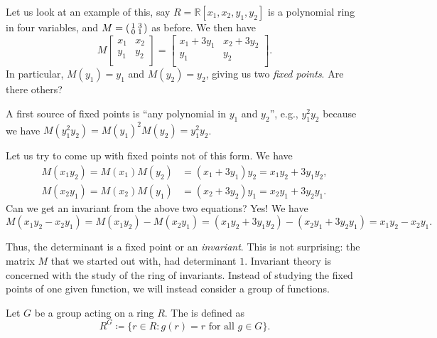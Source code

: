 \documentclass[12pt]{article}
\begin{document}
	Let us look at an example of this, say 
	$R = \mathbb{R}[x_{1}, x_{2}, y_{1}, y_{2}]$ is a polynomial ring in four variables, and 
	$M = \left(\begin{smallmatrix} 1 & 3 \\ 0 & 1 \end{smallmatrix}\right)$ as before. 
	We then have
	\begin{equation*} 
		M
		\begin{bmatrix}
			x_{1} & x_{2} \\
			y_{1} & y_{2} \\
		\end{bmatrix}
		=
		\begin{bmatrix}
			x_{1} + 3 y_{1} & x_{2} + 3 y_{2} \\
			y_{1} & y_{2} \\
		\end{bmatrix}.
	\end{equation*}
	In particular, $M(y_{1}) = y_{1}$ and $M(y_{2}) = y_{2}$, giving us two \emph{fixed points}. 
	Are there others? 

	A first source of fixed points is ``any polynomial in $y_{1}$ and $y_{2}$'', e.g., 
	$y_{1}^{2} y_{2}$ because we have 
	$M(y_{1}^{2} y_{2}) = M(y_{1})^{2} M(y_{2}) = y_{1}^{2} y_{2}$.

	Let us try to come up with fixed points not of this form. 
	We have
	\begin{align*} 
		M(x_{1} y_{2}) = M(x_{1}) M(y_{2}) &= (x_{1} + 3y_{1}) y_{2} = x_{1} y_{2} + 3 y_{1} y_{2}, \\
		M(x_{2} y_{1}) = M(x_{2}) M(y_{1}) &= (x_{2} + 3y_{2}) y_{1} = x_{2} y_{1} + 3 y_{2} y_{1}.
	\end{align*}
	Can we get an invariant from the above two equations? 
	Yes! We have
	\begin{equation*} 
		M(x_{1} y_{2} - x_{2} y_{1}) = M(x_{1} y_{2}) - M(x_{2} y_{1}) 
		= (x_{1} y_{2} + 3 y_{1} y_{2}) - (x_{2} y_{1} + 3 y_{2} y_{1} )
		= x_{1} y_{2} - x_{2} y_{1}.
	\end{equation*}

	Thus, the determinant is a fixed point or an \emph{invariant}. This is not surprising: the matrix $M$ that we started out with, had determinant $1$. 
	Invariant theory is concerned with the study of the ring of invariants. 
	Instead of studying the fixed points of one given function, we will instead consider a group of functions.

	\begin{defn}
		Let $G$ be a group acting on a ring $R$. 
		The  is defined as
		\begin{equation*} 
			R^{G} \coloneqq \{r \in R : g(r) = r \text{ for all } g \in G\}.
		\end{equation*}
	\end{defn}
\end{document}
